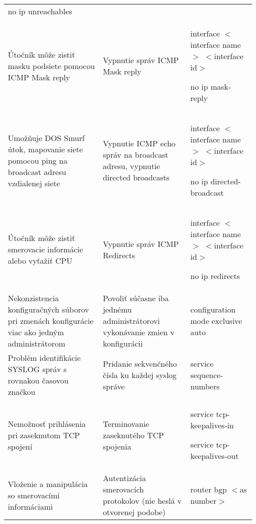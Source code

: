 \begin{longtable}[!htbp]{|L{10em}L{10em}>{\selectfont}L{34em}|}
	\hspace{0.5em}no ip unreachables\\
	
	
	
	
	Útočník môže zistiť masku podsiete pomocou ICMP Mask reply	&Vypnutie správ ICMP Mask reply	&interface $<$interface name$>$ $<$interface id$>$
	
	\hspace{0.5em}no ip mask-reply\\
	
	
	
	
	 Umožňuje DOS Smurf útok, mapovanie siete pomocou ping na broadcast adresu vzdialenej siete	&Vypnutie ICMP echo správ na broadcast adresu, vypnutie directed broadcasts	&interface $<$interface name$>$ $<$interface id$>$
	
	\hspace{0.5em}no ip directed-broadcast\\
	
	
	
	
	Útočník môže zistiť smerovacie informácie alebo vyťažiť CPU	&Vypnutie správ ICMP Redirects	&interface $<$interface name$>$ $<$interface id$>$
	
	\hspace{0.5em}no ip redirects\\
	
	
	
	 Nekonzistencia konfiguračných súborov pri zmenách konfigurácie viac ako jedným administrátorom	&Povoliť súčasne iba jednému administrátorovi vykonávanie zmien v konfigurácii	&configuration mode exclusive auto\\
	
	
	
	
	Problém identifikácie SYSLOG správ s rovnakou časovou značkou	&Pridanie sekvenčného čísla ku každej syslog správe	&service sequence-numbers\\
	
	
	
	
	 Nemožnosť prihlásenia pri zaseknutom TCP spojení	&Terminovanie zaseknutého TCP spojenia	&service tcp-keepalives-in
	
	service tcp-keepalives-out\\
	
	
	
	
	Vloženie a manipulácia so smerovacími informáciami	&Autentizácia smerovacích protokolov (nie heslá v otvorenej podobe)	&router bgp $<$as number$>$
	

\end{longtable}

